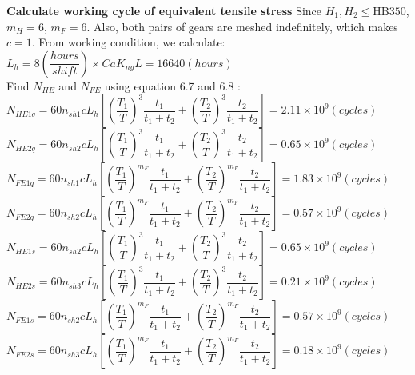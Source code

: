 \textbf{Calculate working cycle of equivalent tensile stress} Since $ H_1,H_2\leq\text{HB}350 $, $ m_H=6 $, $ m_F=6 $. Also, both pairs of gears are meshed indefinitely, which makes $ c=1 $. From working condition, we calculate:\\
$ L_h = 8\unit{\left( \dfrac{hours}{shift}\right)}\times Ca  K_{ng} L=16640\unit{(hours)}$\\
Find $ N_{HE} $ and $ N_{FE} $  using equation 6.7 and 6.8 \cite{tk1}:\\
$ N_{HE1q} = 60n_{sh1}cL_h\left[ \left( \dfrac{T_1}{T}\right)^3\dfrac{t_1}{t_1+t_2} + \left( \dfrac{T_2}{T}\right)^3\dfrac{t_2}{t_1+t_2}\right] = 2.11\times10^9\unit{(cycles)}$\\
$ N_{HE2q} = 60n_{sh2}cL_h\left[ \left( \dfrac{T_1}{T}\right)^3\dfrac{t_1}{t_1+t_2} + \left( \dfrac{T_2}{T}\right)^3\dfrac{t_2}{t_1+t_2}\right] = 0.65\times10^9\unit{(cycles)}$\\
$ N_{FE1q} = 60n_{sh1}cL_h\left[ \left( \dfrac{T_1}{T}\right)^{m_F}\dfrac{t_1}{t_1+t_2} + \left( \dfrac{T_2}{T}\right)^{m_F}\dfrac{t_2}{t_1+t_2}\right] = 1.83\times10^9\unit{(cycles)}$\\
$ N_{FE2q} = 60n_{sh2}cL_h\left[ \left( \dfrac{T_1}{T}\right)^{m_F}\dfrac{t_1}{t_1+t_2} + \left( \dfrac{T_2}{T}\right)^{m_F}\dfrac{t_2}{t_1+t_2}\right] = 0.57\times10^9\unit{(cycles)}$\\
$ N_{HE1s} = 60n_{sh2}cL_h\left[ \left( \dfrac{T_1}{T}\right)^3\dfrac{t_1}{t_1+t_2} + \left( \dfrac{T_2}{T}\right)^3\dfrac{t_2}{t_1+t_2}\right] = 0.65\times10^9\unit{(cycles)}$\\
$ N_{HE2s} = 60n_{sh3}cL_h\left[ \left( \dfrac{T_1}{T}\right)^3\dfrac{t_1}{t_1+t_2} + \left( \dfrac{T_2}{T}\right)^3\dfrac{t_2}{t_1+t_2}\right] = 0.21\times10^9\unit{(cycles)}$\\
$ N_{FE1s} = 60n_{sh2}cL_h\left[ \left( \dfrac{T_1}{T}\right)^{m_F}\dfrac{t_1}{t_1+t_2} + \left( \dfrac{T_2}{T}\right)^{m_F}\dfrac{t_2}{t_1+t_2}\right] = 0.57\times10^9\unit{(cycles)}$\\
$ N_{FE2s} = 60n_{sh3}cL_h\left[ \left( \dfrac{T_1}{T}\right)^{m_F}\dfrac{t_1}{t_1+t_2} + \left( \dfrac{T_2}{T}\right)^{m_F}\dfrac{t_2}{t_1+t_2}\right] = 0.18\times10^9\unit{(cycles)}$\\

